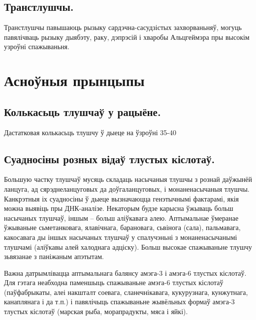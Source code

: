 \subsection{Транстлушчы.}
Транстлушчы павышаюць рызыку сардэчна-сасудзістых захворваньняў, могуць павялічваць рызыку дыябэту, раку, дэпрэсій і хваробы Альцгеймэра пры высокім узроўні спажываньня.

\section{Асноўныя прынцыпы}

\subsection{Колькасьць тлушчаў у рацыёне.}
Дастатковая колькасьць тлушчу ў дыеце на ўзроўні 35-40%

\subsection{Суадносіны розных відаў тлустых кіслотаў.}
Большую частку тлушчаў мусяць складаць насычаныя тлушчы з рознай даўжынёй ланцуга, ад сярэднеланцуговых да доўгаланцуговых, і монаненасычаныя тлушчы. Канкрэтныя іх суадносіны ў дыеце вызначаюцца генэтычнымі фактарамі, якія можна выявіць пры ДНК-аналізе. Некаторым будзе карысна ўжываць больш насычаных тлушчаў, іншым – больш аліўкавага алею. Аптымальнае ўмеранае ўжываньне сьметанковага, ялавічнага, барановага, сьвінога (сала), пальмавага, какосавага ды іншых насычаных тлушчаў у спалучэньні з монаненасычанымі тлушчамі (аліўкавы алей халоднага адціску). Больш высокае спажываньне тлушчу зьвязанае з паніжаным апэтытам.

Важна датрымлівацца аптымальнага балянсу амэга-3 і амэга-6 тлустых кіслотаў. Для гэтага неабходна паменшыць спажываньне амэга-6 тлустых кіслотаў (паўфабрыкаты, алеі накшталт соевага, сланечнікавага, кукурузнага, кунжутнага, канаплянага і да т.п.) і павялічыць спажываньне жывёльных формаў амэга-3 тлустых кіслотаў (марская рыба, морапрадукты, мяса і яйкі).

